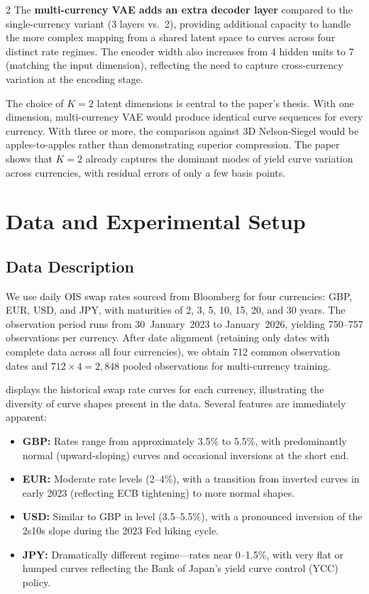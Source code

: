 \documentclass[10pt,a4paper]{article}
\theoremstyle{plain}
\theoremstyle{definition}
\begin{document}
\begin{multicols}{2}
The \textbf{multi-currency VAE adds an extra decoder layer} compared to the single-currency variant (3 layers vs.\ 2), providing additional capacity to handle the more complex mapping from a shared latent space to curves across four distinct rate regimes. The encoder width also increases from 4 hidden units to 7 (matching the input dimension), reflecting the need to capture cross-currency variation at the encoding stage.

The choice of $K=2$ latent dimensions is central to the paper's thesis. With one dimension, multi-currency VAE would produce identical curve sequences for every currency. With three or more, the comparison against 3D Nelson-Siegel would be apples-to-apples rather than demonstrating superior compression. The paper shows that $K=2$ already captures the dominant modes of yield curve variation across currencies, with residual errors of only a few basis points.

\section{Data and Experimental Setup}\label{sec:data}

\subsection{Data Description}

We use daily OIS swap rates sourced from Bloomberg for four currencies: GBP, EUR, USD, and JPY, with maturities of 2, 3, 5, 10, 15, 20, and 30 years. The observation period runs from 30~January~2023 to January~2026, yielding 750--757 observations per currency. After date alignment (retaining only dates with complete data across all four currencies), we obtain 712 common observation dates and $712 \times 4 = 2{,}848$ pooled observations for multi-currency training.

 displays the historical swap rate curves for each currency, illustrating the diversity of curve shapes present in the data. Several features are immediately apparent:
\begin{itemize}[nosep]
\item \textbf{GBP:} Rates range from approximately 3.5\% to 5.5\%, with predominantly normal (upward-sloping) curves and occasional inversions at the short end.
\item \textbf{EUR:} Moderate rate levels (2--4\%), with a transition from inverted curves in early 2023 (reflecting ECB tightening) to more normal shapes.
\item \textbf{USD:} Similar to GBP in level (3.5--5.5\%), with a pronounced inversion of the 2s10s slope during the 2023 Fed hiking cycle.
\item \textbf{JPY:} Dramatically different regime---rates near 0--1.5\%, with very flat or humped curves reflecting the Bank of Japan's yield curve control (YCC) policy.
\end{itemize}


\end{multicols}
\end{document}
